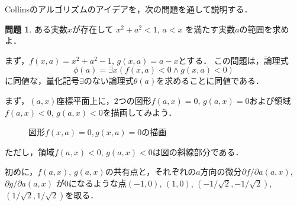 \documentclass[uplatex, dvipdfmx]{jsarticle}
\numberwithin{equation}{section}
\theoremstyle{definition}
\newtheorem{question}[definition]{問題}
\begin{document}
     Collinsのアルゴリズムのアイデアを，次の問題を通して説明する．
     \begin{question}
          ある実数$x$が存在して
          $x^2 + a^2 < 1$, $a < x$
          を満たす実数$a$の範囲を求めよ．          
     \end{question}
     まず，$f(x,a) = x^2 + a^2 -1$, $g(x,a) = a-x$とする．
     この問題は，論理式
     \begin{equation}
          \phi(a) = \exists x (f(x,a)<0 \land g(x,a)<0)
     \end{equation}
     に同値な，量化記号$\exists$のない論理式$\theta(a)$を求めることに同値である．

     まず，$(a, x)$座標平面上に，$2$つの図形$f(a,x)=0$, $g(a,x)=0$および領域$f(a,x)<0$, $g(a,x)<0$を描画してみよう．
     \begin{figure}[H]
          \centering
          \caption{図形$f(x,a)=0, g(x,a)=0$の描画}
          \label{fig:pic1}
     \end{figure}
     
     ただし，領域$f(a,x)<0$, $g(a,x)<0$は図の斜線部分である．

     初めに，$f(a,x)$, $g(a,x)$の共有点と，それぞれの$a$方向の微分$\partial f/\partial a(a,x)$, $\partial g/\partial a(a,x)$ 
     が$0$になるような点$(-1,0)$, $(1,0)$, $(-1/\sqrt{2},-1/\sqrt{2})$, $(1/\sqrt{2},1/\sqrt{2})$を取る．
\end{document}
